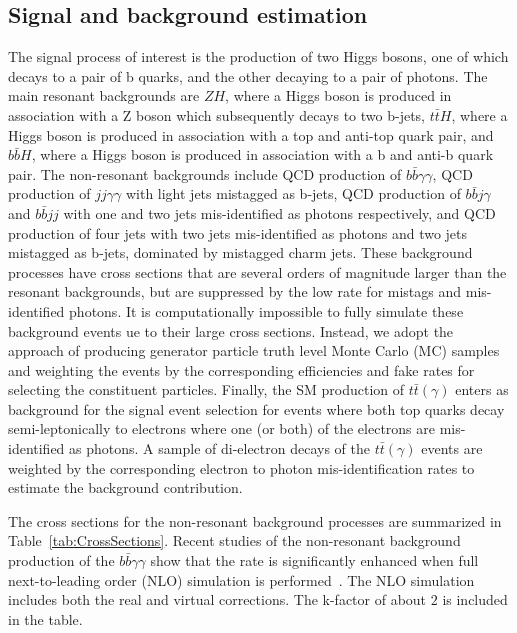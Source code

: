 \subsection{Signal and background estimation}
\label{sec:bkgestimation}
The signal process of interest is the production of two Higgs bosons, one of which decays to a pair of b quarks, and the other decaying to a pair of photons. The main resonant backgrounds are $ZH$, where a Higgs boson is produced in association with a Z boson which subsequently decays to two b-jets, $t\bar{t}H$, where a Higgs boson is produced in association with a top and anti-top quark pair, and $b\bar{b}H$, where a Higgs boson is produced in association with a b and anti-b quark pair. The non-resonant backgrounds include QCD production  of $b \bar{b} \gamma\gamma$, QCD production of $jj \gamma\gamma$ with light jets mistagged  as b-jets, QCD production of $b \bar{b} j \gamma$ and $b \bar{b} jj$ with one and two jets mis-identified as photons respectively, and QCD production of four jets with two jets mis-identified  as photons and two jets mistagged as b-jets, dominated by mistagged charm jets. 
These background processes have cross sections that are several orders of magnitude larger than the resonant backgrounds, but are suppressed
by the low rate for mistags and mis-identified photons.  It is computationally impossible to fully simulate these background events ue to their large cross sections. Instead, we adopt the approach of producing generator particle truth level Monte Carlo (MC) samples and weighting the events by the corresponding efficiencies and fake rates for selecting the constituent particles. Finally, the SM  production of $t\bar{t}(\gamma)$ enters as background for the signal event selection for events where both top quarks decay semi-leptonically to electrons where one (or both) of the electrons are mis-identified as photons. A sample of di-electron decays of the $t\bar{t}(\gamma)$ events are weighted by the corresponding electron to photon mis-identification rates to estimate the background contribution.

The cross sections for the non-resonant background processes are summarized in Table~\ref{tab:CrossSections}. Recent studies of the non-resonant background production of the $b \bar{b} \gamma\gamma$ show that the rate is significantly enhanced when full next-to-leading order (NLO) simulation is performed~\cite{Azatov:2015oxa}. The NLO simulation includes both the real and virtual corrections. The k-factor of about $2$ is included in the table.  


